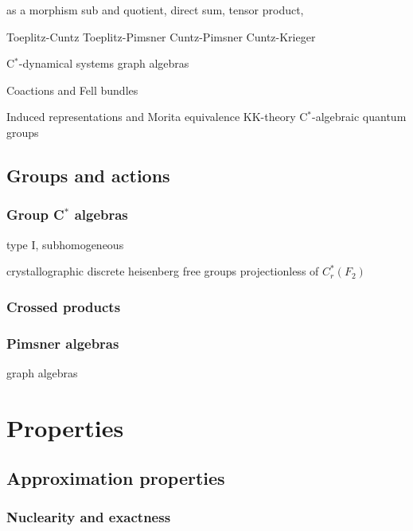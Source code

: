 \documentclass{../../large}
\begin{document}
as a morphism
sub and quotient, direct sum, tensor product,

Toeplitz-Cuntz
Toeplitz-Pimsner
Cuntz-Pimsner
Cuntz-Krieger

C$^*$-dynamical systems
graph algebras



Coactions and Fell bundles



Induced representations and Morita equivalence
KK-theory
C$^*$-algebraic quantum groups











\chapter{Groups and actions}



\section{Group C$^*$ algebras}
type I, subhomogeneous


crystallographic
discrete heisenberg
free groups
projectionless of $C_r^*(F_2)$


\section{Crossed products}

\section{Pimsner algebras}
graph algebras








\part{Properties}
\chapter{Approximation properties}
\section{Nuclearity and exactness}
\end{document}
